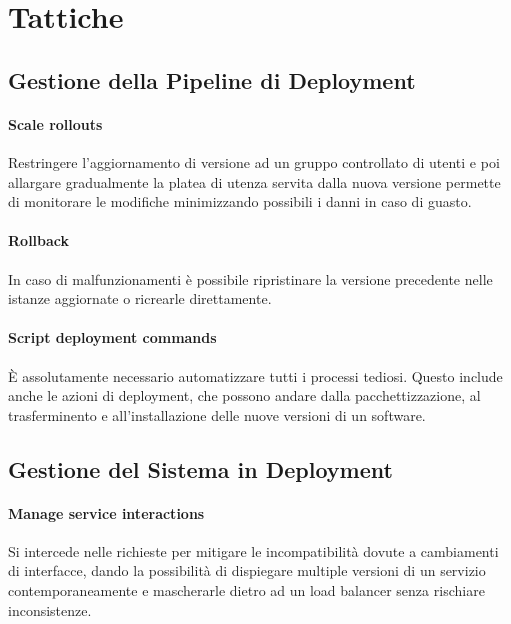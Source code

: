 \documentclass[a4paper,11pt,oneside, table]{article}
\begin{document}
  \section{Tattiche}

  \subsection{Gestione della Pipeline di Deployment}

  \paragraph{Scale rollouts}

  Restringere l'aggiornamento di versione ad un gruppo controllato di utenti e poi allargare gradualmente la platea di utenza servita dalla nuova versione permette di monitorare le modifiche minimizzando possibili i danni in caso di guasto.

  \paragraph{Rollback}

  In caso di malfunzionamenti \`e possibile ripristinare la versione precedente nelle istanze aggiornate o ricrearle direttamente.

  \paragraph{Script deployment commands}

  \`E assolutamente necessario automatizzare tutti i processi tediosi. Questo include anche le azioni di deployment, che possono andare dalla pacchettizzazione, al trasferminento e all'installazione delle nuove versioni di un software.

  \subsection{Gestione del Sistema in Deployment}

  \paragraph{Manage service interactions}

  Si intercede nelle richieste per mitigare le incompatibilit\`a dovute a cambiamenti di interfacce, dando la possibilit\`a di dispiegare multiple versioni di un servizio contemporaneamente e mascherarle dietro ad un load balancer senza rischiare inconsistenze.
\end{document}

